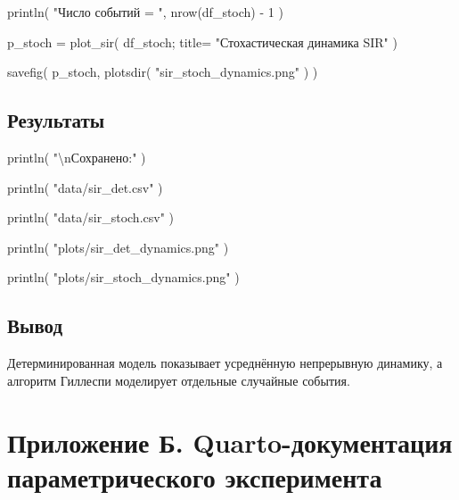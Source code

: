 \documentclass[
  english,
  russian,
  12pt,
  a4paper,
  DIV=11,
  numbers=noendperiod]{scrreprt}
\newenvironment{Shaded}{\begin{snugshade}}{\end{snugshade}}
\newcommand{\FloatTok}[1]{\textcolor[rgb]{0.68,0.00,0.00}{#1}}
\newcommand{\FunctionTok}[1]{\textcolor[rgb]{0.28,0.35,0.67}{#1}}
\newcommand{\NormalTok}[1]{\textcolor[rgb]{0.00,0.23,0.31}{#1}}
\newcommand{\OperatorTok}[1]{\textcolor[rgb]{0.37,0.37,0.37}{#1}}
\newcommand{\SpecialCharTok}[1]{\textcolor[rgb]{0.37,0.37,0.37}{#1}}
\newcommand{\StringTok}[1]{\textcolor[rgb]{0.13,0.47,0.30}{#1}}
\begin{document}
\begin{Shaded}
\begin{Highlighting}[]
\FunctionTok{println}\NormalTok{(}
    \StringTok{"Число событий = "}\NormalTok{,}
    \FunctionTok{nrow}\NormalTok{(df\_stoch) }\OperatorTok{{-}} \FloatTok{1}
\NormalTok{)}

\NormalTok{p\_stoch }\OperatorTok{=}
    \FunctionTok{plot\_sir}\NormalTok{(}
\NormalTok{        df\_stoch;}
\NormalTok{        title}\OperatorTok{=}
            \StringTok{"Стохастическая динамика SIR"}
\NormalTok{    )}

\FunctionTok{savefig}\NormalTok{(}
\NormalTok{    p\_stoch,}
    \FunctionTok{plotsdir}\NormalTok{(}
        \StringTok{"sir\_stoch\_dynamics.png"}
\NormalTok{    )}
\NormalTok{)}
\end{Highlighting}
\end{Shaded}

\section{Результаты}\label{ux440ux435ux437ux443ux43bux44cux442ux430ux442ux44b}

\begin{Shaded}
\begin{Highlighting}[]
\FunctionTok{println}\NormalTok{(}
    \StringTok{"}\SpecialCharTok{\textbackslash{}n}\StringTok{Сохранено:"}
\NormalTok{)}

\FunctionTok{println}\NormalTok{(}
    \StringTok{"data/sir\_det.csv"}
\NormalTok{)}

\FunctionTok{println}\NormalTok{(}
    \StringTok{"data/sir\_stoch.csv"}
\NormalTok{)}

\FunctionTok{println}\NormalTok{(}
    \StringTok{"plots/sir\_det\_dynamics.png"}
\NormalTok{)}

\FunctionTok{println}\NormalTok{(}
    \StringTok{"plots/sir\_stoch\_dynamics.png"}
\NormalTok{)}
\end{Highlighting}
\end{Shaded}

\section{Вывод}\label{ux432ux44bux432ux43eux434}

Детерминированная модель показывает усреднённую непрерывную динамику, а
алгоритм Гиллеспи моделирует отдельные случайные события.

\chapter*{Приложение Б. Quarto-документация параметрического
эксперимента}\label{ux43fux440ux438ux43bux43eux436ux435ux43dux438ux435-ux431.-quarto-ux434ux43eux43aux443ux43cux435ux43dux442ux430ux446ux438ux44f-ux43fux430ux440ux430ux43cux435ux442ux440ux438ux447ux435ux441ux43aux43eux433ux43e-ux44dux43aux441ux43fux435ux440ux438ux43cux435ux43dux442ux430}
\end{document}
